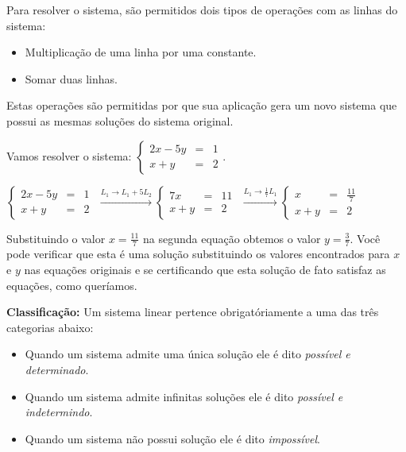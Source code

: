 Para resolver o sistema, são permitidos dois tipos de operações com as linhas do sistema:

\begin{itemize}
\item Multiplicação de uma linha por uma constante.
\item Somar duas linhas.
\end{itemize}

Estas operações são permitidas por que sua aplicação gera um novo sistema que possui as mesmas soluções do sistema original.

\begin{ex}Vamos resolver o sistema: $\left\{ \begin{array}{rcl}
2x-5y&=&1\\
x+y&=&2
\end{array}\right. .$


\noindent$\left\{ \begin{array}{rcl}
2x-5y&=&1\\
x+y&=&2
\end{array}\right.$ $\xrightarrow[]{L_1\rightarrow L_1+5L_2}\left\{ \begin{array}{rcl}
7x&=&11\\
x+y&=&2
\end{array}\right.$
$\xrightarrow[]{L_1\rightarrow\frac{1}{7}L_1}\left\{ \begin{array}{rcl}
x&=&\frac{11}{7}\\
x+y&=&2
\end{array}\right.$
\end{ex}

\noindent Substituindo o valor $x=\frac{11}{7}$ na segunda equação obtemos o valor $y=\frac{3}{7}$. Você pode verificar que esta é uma solução
substituindo os valores encontrados para $x$ e $y$ nas equações originais e se certificando que esta solução de fato satisfaz as equações,
como queríamos.

\noindent\textbf{Classificação:} Um sistema linear pertence obrigatóriamente a uma das três categorias abaixo:
\begin{mybox} \begin{itemize}
\item Quando um sistema admite uma única solução ele é dito \textit{possível e determinado}.
\item Quando um sistema admite infinitas soluções ele é dito \textit{possível e indetermindo}.
\item Quando um sistema não possui solução ele é dito \textit{impossível}.
\end{itemize}
\end{mybox}

